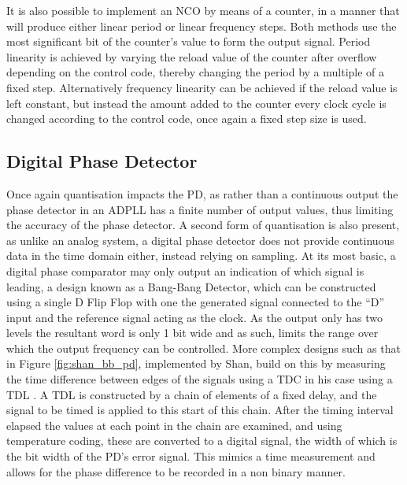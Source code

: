 It is also possible to implement an \ac{NCO} by means of a counter, in a manner that will produce either linear period or linear frequency steps. Both methods use the most significant bit of the counter's value to form the output signal. Period linearity is achieved by varying the reload value of the counter after overflow depending on the control code, thereby changing the period by a multiple of a fixed step. Alternatively frequency linearity can be achieved if the reload value is left constant, but instead the amount added to the counter every clock cycle is changed according to the control code, once again a fixed step size is used.

\subsection{Digital Phase Detector}
Once again quantisation impacts the \acl{PD}, as rather than a continuous output the phase detector in an \ac{ADPLL} has a finite number of output values, thus limiting the accuracy of the phase detector. A second form of quantisation is also present, as unlike an analog system, a digital phase detector does not provide continuous data in the time domain either, instead relying on sampling. At its most basic, a digital phase comparator may only output an indication of which signal is leading, a design known as a Bang-Bang Detector, which can be constructed using a single D Flip Flop with one the generated signal connected to the ``D'' input and the reference signal acting as the clock. As the output only has two levels the resultant word is only 1 bit wide and as such, limits the range over which the output frequency can be controlled. More complex designs such as that in Figure \ref{fig:shan_bb_pd}, implemented by Shan, build on this by measuring the time difference between edges of the signals using a \ac{TDC} in his case using a \ac{TDL} \cite{shan2014phd}. A \ac{TDL} is constructed by a chain of elements of a fixed delay, and the signal to be timed is applied to this start of this chain. After the timing interval elapsed the values at each point in the chain are examined, and using temperature coding, these are converted to a digital signal, the width of which is the bit width of the \ac{PD}'s error signal. This mimics a time measurement and allows for the phase difference to be recorded in a non binary manner.


